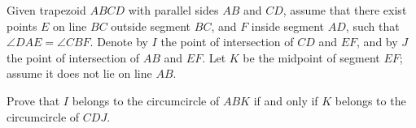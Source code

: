 Given trapezoid $ABCD$ with parallel sides $AB$ and $CD$, assume that there exist points $E$ on line $BC$ outside segment $BC$, and $F$ inside segment $AD$, such that $\angle DAE = \angle CBF$. Denote by $I$ the point of intersection of $CD$ and $EF$, and by $J$ the point of intersection of $AB$ and $EF$. Let $K$ be the midpoint of segment $EF$; assume it does not lie on line $AB$.

Prove that $I$ belongs to the circumcircle of $ABK$ if and only if $K$ belongs to the circumcircle of $CDJ$.
